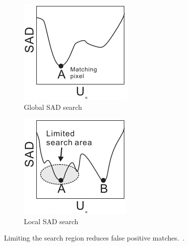 \begin{figure}[h]
\begin{center}
	\begin{subfigure}{0.4\textwidth}
		\includegraphics[width=\textwidth]{figures/sadGlobalGraph.png}
		\caption{Global SAD search}
		\label{fig:globalSAD}
	\end{subfigure}
	\begin{subfigure}{0.4\textwidth}
		\includegraphics[width=\textwidth]{figures/sadLocalGraph.png}
		\caption{Local SAD search}
		\label{fig:localSAD}
	\end{subfigure}
	\captionfonts
	\caption{Limiting the search region reduces false positive matches.~\cite{sadParallel}.}%
	\label{fig:sadGraphs}
\end{center}
\end{figure}

